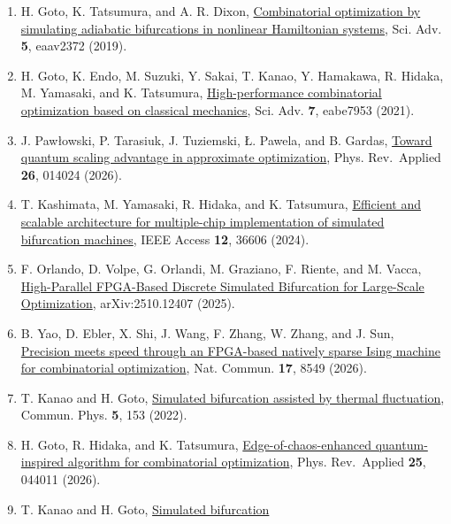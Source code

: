 \documentclass[
  10pt,
]{article}
\begin{document}
\begin{enumerate}
\item
  \hypertarget{ref:20}{} H. Goto, K. Tatsumura, and A. R. Dixon,
  \href{https://doi.org/10.1126/sciadv.aav2372}{Combinatorial
  optimization by simulating adiabatic bifurcations in nonlinear
  Hamiltonian systems}, Sci. Adv. \textbf{5}, eaav2372 (2019).
\item
  \hypertarget{ref:21}{} H. Goto, K. Endo, M. Suzuki, Y. Sakai, T. Kanao, Y. Hamakawa, R.
  Hidaka, M. Yamasaki, and K. Tatsumura,
  \href{https://doi.org/10.1126/sciadv.abe7953}{High-performance
  combinatorial optimization based on classical mechanics}, Sci. Adv.
  \textbf{7}, eabe7953 (2021).
\item
  \hypertarget{ref:22}{} J. Pawłowski, P. Tarasiuk, J. Tuziemski, Ł. Pawela, and B. Gardas,
  \href{https://doi.org/10.1103/qcws-8kgm}{Toward quantum scaling
  advantage in approximate optimization}, Phys. Rev.~Applied
  \textbf{26}, 014024 (2026).
\item
  \hypertarget{ref:23}{} T. Kashimata, M. Yamasaki, R. Hidaka, and K. Tatsumura,
  \href{https://doi.org/10.1109/ACCESS.2024.3374089}{Efficient and
  scalable architecture for multiple-chip implementation of simulated
  bifurcation machines}, IEEE Access \textbf{12}, 36606 (2024).
\item
  \hypertarget{ref:24}{} F. Orlando, D. Volpe, G. Orlandi, M. Graziano, F. Riente, and M.
  Vacca, \href{https://arxiv.org/abs/2510.12407}{High-Parallel
  FPGA-Based Discrete Simulated Bifurcation for Large-Scale
  Optimization}, arXiv:2510.12407 (2025).
\item
  \hypertarget{ref:25}{} B. Yao, D. Ebler, X. Shi, J. Wang, F. Zhang, W. Zhang, and J. Sun,
  \href{https://doi.org/10.1038/s41467-026-75119-0}{Precision meets
  speed through an FPGA-based natively sparse Ising machine for
  combinatorial optimization}, Nat. Commun. \textbf{17}, 8549 (2026).
\item
  \hypertarget{ref:26}{} T. Kanao and H. Goto,
  \href{https://doi.org/10.1038/s42005-022-00929-9}{Simulated
  bifurcation assisted by thermal fluctuation}, Commun. Phys.
  \textbf{5}, 153 (2022).
\item
  \hypertarget{ref:27}{} H. Goto, R. Hidaka, and K. Tatsumura,
  \href{https://doi.org/10.1103/2qd9-x6v8}{Edge-of-chaos-enhanced
  quantum-inspired algorithm for combinatorial optimization}, Phys.
  Rev.~Applied \textbf{25}, 044011 (2026).
\item
  \hypertarget{ref:28}{} T. Kanao and H. Goto,
  \href{https://doi.org/10.35848/1882-0786/acaba9}{Simulated bifurcation
}
\end{enumerate}
\end{document}
